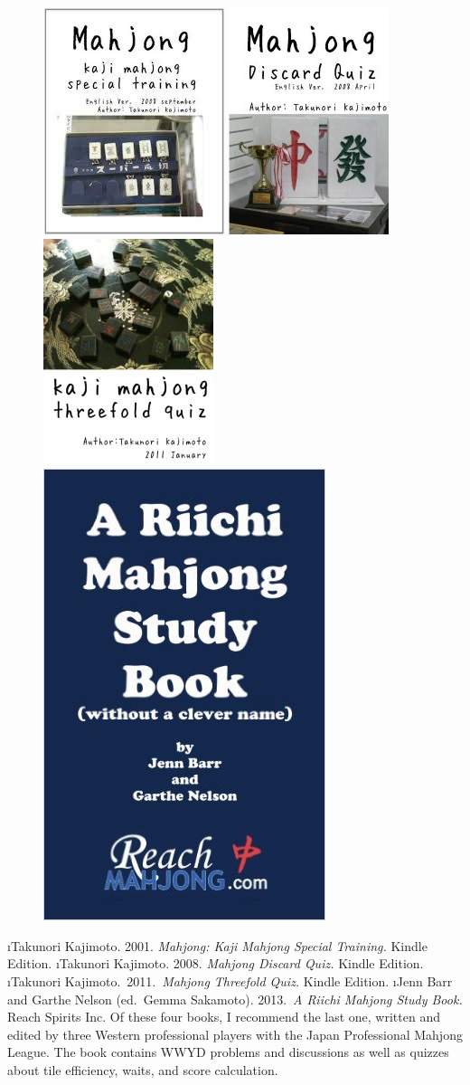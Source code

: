 \begin{figure}
\begin{center}
\includegraphics[height=.33\textwidth,clip]{figs/kaji1}
\includegraphics[height=.33\textwidth,clip]{figs/kaji2}
\includegraphics[height=.33\textwidth,clip]{figs/kaji3}
\includegraphics[height=.33\textwidth,clip]{figs/barr2}
\end{center}
\end{figure}



\be \setcounter{enumi}{1}
\i Takunori Kajimoto. 2001. \textit{Mahjong: Kaji Mahjong Special Training.} Kindle Edition.
\i Takunori Kajimoto. 2008. \textit{Mahjong Discard Quiz.} Kindle Edition.
\i Takunori Kajimoto.~2011.~\textit{Mahjong Threefold Quiz.} Kindle Edition.
\i Jenn Barr and Garthe Nelson (ed.~Gemma Sakamoto). 2013.~\textit{A Riichi Mahjong Study Book.} Reach Spirits Inc.
\ee {}
Of these four books, I recommend the last one, written and edited by three Western professional players with the Japan Professional Mahjong League. The book contains WWYD problems and discussions as well as quizzes about tile efficiency, waits, and score calculation. 

